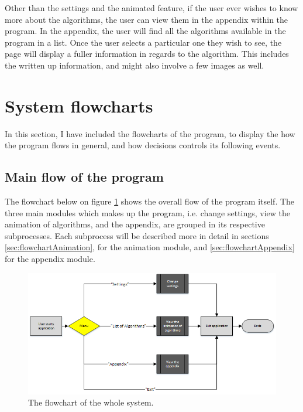Other than the settings and the animated feature, if the user ever wishes to know more about the algorithms, the user can view them in the appendix within the program. In the appendix, the user will find all the algorithms available in the program in a list. Once the user selects a particular one they wish to see, the page will display a fuller information in regards to the algorithm. This includes the written up information, and might also involve a few images as well.

\newpage

\section{System flowcharts}
In this section, I have included the flowcharts of the program, to display the how the program flows in general, and how decisions controls its following events. 

\subsection{Main flow of the program}
The flowchart below on figure \ref{mainFlowChart} shows the overall flow of the program itself. The three main modules which makes up the program, i.e. change settings, view the animation of algorithms, and the appendix, are grouped in its respective subprocesses. Each subprocess will be described more in detail in sections \ref{sec:flowchartAnimation}, for the animation module, and \ref{sec:flowchartAppendix} for the appendix module.

\begin{figure}[H]
\centering
\hspace*{-1cm}
\includegraphics[scale=1]{images/report_images/flowchartMain.png}
\caption{The flowchart of the whole system.}
\label{mainFlowChart}
\end{figure}

